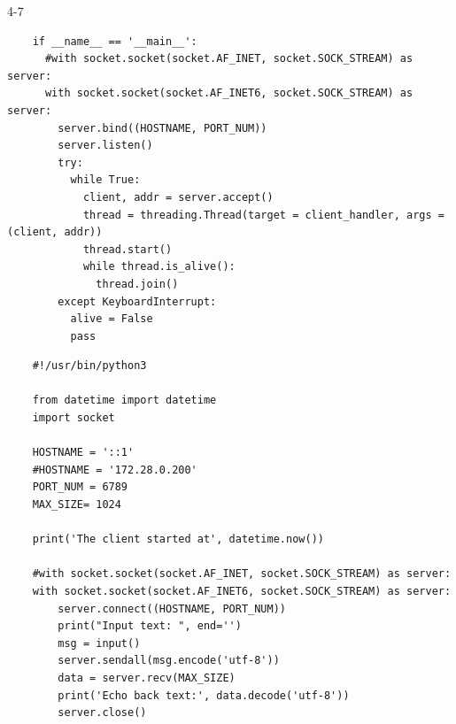 \begin{maintask}{4-7}
\begin{listing}[H]
\begin{verbatim}
    if __name__ == '__main__':
      #with socket.socket(socket.AF_INET, socket.SOCK_STREAM) as server:
      with socket.socket(socket.AF_INET6, socket.SOCK_STREAM) as server:
        server.bind((HOSTNAME, PORT_NUM))
        server.listen()
        try:
          while True:
            client, addr = server.accept()
            thread = threading.Thread(target = client_handler, args = (client, addr))
            thread.start()
            while thread.is_alive():
              thread.join()
        except KeyboardInterrupt:
          alive = False
          pass
    \end{verbatim}
  \end{listing}
  \begin{listing}[H]
    \caption{IPv6対応tcp\_client.py}\label{lst:ipv6_client}
    \begin{verbatim}
    #!/usr/bin/python3

    from datetime import datetime
    import socket

    HOSTNAME = '::1'
    #HOSTNAME = '172.28.0.200'
    PORT_NUM = 6789
    MAX_SIZE= 1024

    print('The client started at', datetime.now())

    #with socket.socket(socket.AF_INET, socket.SOCK_STREAM) as server:
    with socket.socket(socket.AF_INET6, socket.SOCK_STREAM) as server:
        server.connect((HOSTNAME, PORT_NUM))
        print("Input text: ", end='')
        msg = input()
        server.sendall(msg.encode('utf-8'))
        data = server.recv(MAX_SIZE)
        print('Echo back text:', data.decode('utf-8'))
        server.close()
    \end{verbatim}
  \end{listing}


\end{maintask}
